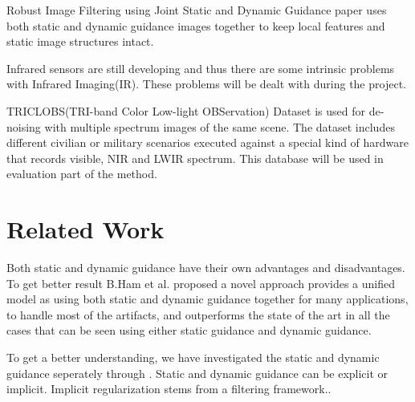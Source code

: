 \documentclass[10pt,twocolumn,letterpaper]{article}
\begin{document}
Robust Image Filtering using Joint Static and Dynamic Guidance\cite{ham2015} paper uses both static and dynamic guidance images together to keep local features and static image structures intact.

Infrared sensors are still developing and thus there are some intrinsic problems with Infrared Imaging(IR). These problems will be dealt with during the project.

TRICLOBS(TRI-band Color Low-light OBServation) Dataset\cite{triclobs} is used for de-noising with multiple spectrum images of the same scene. The dataset includes different civilian or military scenarios executed against a special kind of hardware that records visible, NIR and LWIR spectrum. This database will be used in evaluation part of the method\cite{ham2015}.

\section{Related Work}
Both static and dynamic guidance have their own advantages and disadvantages. To get better result B.Ham et al.\cite{ham2015} proposed a novel approach provides a unified model as using both static and dynamic guidance together for many applications, to handle most of the artifacts, and outperforms the state of the art in all the cases that can be seen using either static guidance and dynamic guidance.

To get a better understanding, we have investigated the static and dynamic guidance seperately through\cite{ham2015} . Static and dynamic guidance can be explicit or implicit. Implicit regularization stems from a filtering framework.\cite{ham2015}. 
\end{document}
